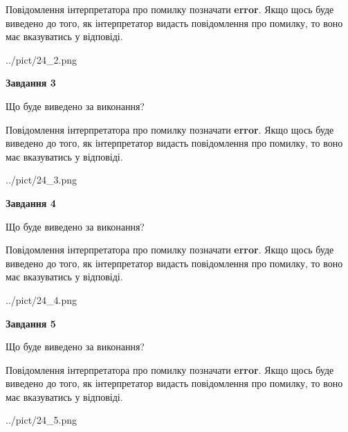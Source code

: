 \documentclass[12pt, ukrainian]{article}
\begin{document}
{\begin {large}
Повідомлення інтерпретатора про помилку позначати \textbf{error}.
Якщо щось буде виведено до того, як інтерпретатор видасть повідомлення про помилку, 
то воно має вказуватись у відповіді. \par


\begin{center}
	{../pict/24_2.png}
\end{center}
\newpage

{\begin {center}\textbf{Завдання 3}\end {center}}\par
Що буде виведено за виконання?

Повідомлення інтерпретатора про помилку позначати \textbf{error}.
Якщо щось буде виведено до того, як інтерпретатор видасть повідомлення про помилку, 
то воно має вказуватись у відповіді. \par


\begin{center}
	{../pict/24_3.png}
\end{center}
\newpage

{\begin {center}\textbf{Завдання 4}\end {center}}\par
Що буде виведено за виконання?

Повідомлення інтерпретатора про помилку позначати \textbf{error}.
Якщо щось буде виведено до того, як інтерпретатор видасть повідомлення про помилку, 
то воно має вказуватись у відповіді. \par


\begin{center}
	{../pict/24_4.png}
\end{center}
\newpage

{\begin {center}\textbf{Завдання 5}\end {center}}\par
Що буде виведено за виконання?

Повідомлення інтерпретатора про помилку позначати \textbf{error}.
Якщо щось буде виведено до того, як інтерпретатор видасть повідомлення про помилку, 
то воно має вказуватись у відповіді. \par


\begin{center}
	{../pict/24_5.png}
\end{center}
\newpage


\end{large}}
\end{document}
